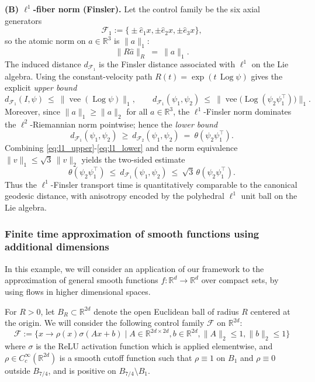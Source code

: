 \documentclass[12pt]{amsart}
\numberwithin{equation}{section}
\theoremstyle{remark}
\begin{document}
\medskip
\noindent\textbf{(B) \(\ell^1\)-fiber norm (Finsler).}
Let the control family be the six axial generators
\[
\mathcal F_1:=\big\{ \pm\hat e_1 x, \pm\hat e_2 x, \pm\hat e_3 x \big\},
\]
so the atomic norm on \(a\in\mathbb R^3\) is \(\|a\|_1\):
\begin{equation}
\|R\hat a\|_{R}\ =\ \|a\|_1.
\end{equation}
The induced distance \(d_{\mathcal F_1}\) is the Finsler distance associated with \(\ell^1\) on the Lie algebra.
Using the constant-velocity path \(R(t)=\exp(t\,\operatorname{Log}\psi)\) gives the explicit \emph{upper bound}
\begin{equation}
\label{eq:l1_upper}
d_{\mathcal F_1}(I,\psi)\ \le\ \big\|\operatorname{vee}(\operatorname{Log}\psi)\big\|_1,\qquad
d_{\mathcal F_1}(\psi_1,\psi_2)\ \le\ \big\|\operatorname{vee}\!\big(\operatorname{Log}(\psi_2 \psi_1^{\top})\big)\big\|_1.
\end{equation}
Moreover, since \(\|a\|_1\ge \|a\|_2\) for all \(a\in\mathbb R^3\), the \(\ell^1\)-Finsler norm dominates the \(\ell^2\)-Riemannian norm pointwise; hence the \emph{lower bound}
\begin{equation}
\label{eq:l1_lower}
d_{\mathcal F_1}(\psi_1,\psi_2)\ \ge\ d_{\mathcal F_2}(\psi_1,\psi_2)\ =\ \theta(\psi_2\psi_1^{\top}).
\end{equation}
Combining \eqref{eq:l1_upper}-\eqref{eq:l1_lower} and the norm equivalence \(\|v\|_1\le \sqrt{3}\,\|v\|_2\) yields the two-sided estimate
\begin{equation}
\theta(\psi_2\psi_1^{\top})\ \le\ d_{\mathcal F_1}(\psi_1,\psi_2)\ \le\ \sqrt{3}\,\theta(\psi_2\psi_1^{\top}).
\end{equation}
Thus the \(\ell^1\)-Finsler transport time is quantitatively comparable to the canonical geodesic distance, with anisotropy encoded by the polyhedral \(\ell^1\) unit ball on the Lie algebra.


\subsubsection{Finite time approximation of smooth functions using additional dimensions}
\label{sec:finite_time_approximation}
In this example, we will consider an application of our framework to the approximation of general smooth functions $f:\mathbb{R}^d\to \mathbb{R}^d$ over compact sets, by using flows in higher dimensional spaces. 

For $R>0$, let $B_R\subset \mathbb{R}^{2d}$ denote the open Euclidean ball of radius $R$ centered at the origin. 
We will consider the following control family $\mathcal F$ on $\mathbb{R}^{2d}$:
\begin{equation}
\mathcal F := \{x\to \rho(x)\sigma(A x+b) \mid A\in \mathbb R^{2d\times 2d}, b\in \mathbb R^{2d}, \|A\|_2 \le 1, \|b\|_2 \le 1 \}
\end{equation}
where $\sigma$ is the ReLU activation function which is applied elementwise, and $\rho\in C_c^\infty(\mathbb{R}^{2d})$ is a smooth cutoff function such that $\rho\equiv 1$ on $B_1$ and $\rho\equiv 0$ outside $B_{7/4}$, and is positive on $B_{7/4}\setminus B_1$. 
\end{document}
